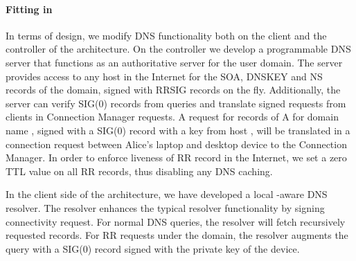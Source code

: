 
\paragraph{Fitting \dnssec in \signpost} In terms of \signpost design, we modify DNS
functionality both on the client and the controller of the architecture. On the
controller we develop a programmable DNS server that functions as
an authoritative server for the user domain. The server provides 
\dnssec access to any host in the Internet for the SOA, DNSKEY and NS records of the
domain, signed with RRSIG records on the fly. Additionally, the server
can verify SIG(0) records from queries and translate signed requests from
\signpost clients in Connection Manager requests. A request for records of A
for domain name , signed with a SIG(0) record with a
key from host , will be translated in a connection request
between Alice's laptop and desktop device to the Connection Manager.
In order to enforce liveness of RR record in the Internet, we set a zero TTL 
value on all RR records, thus disabling any DNS caching.

In the client side of the \signpost architecture, we have developed a local
\signpost-aware DNS resolver. The resolver enhances the typical resolver
functionality by signing \signpost connectivity request. For normal DNS queries,
the resolver will fetch recursively requested records. For RR requests
under the \signpost domain, the resolver augments the query with a SIG(0) record
signed with the private key of the device. 


